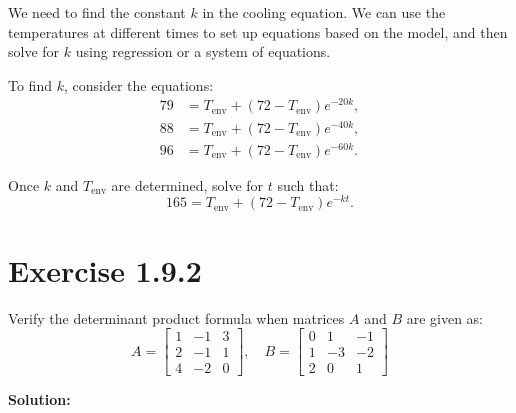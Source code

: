 \documentclass[12pt]{article}
\begin{document}

We need to find the constant \( k \) in the cooling equation. We can use the temperatures at different times to set up equations based on the model, and then solve for \( k \) using regression or a system of equations.


To find \( k \), consider the equations:
\[
  \begin{aligned}
    79 & = T_{\text{env}} + (72 - T_{\text{env}}) e^{-20k}, \\
    88 & = T_{\text{env}} + (72 - T_{\text{env}}) e^{-40k}, \\
    96 & = T_{\text{env}} + (72 - T_{\text{env}}) e^{-60k}.
  \end{aligned}
\]

Once \( k \) and \( T_{\text{env}} \) are determined, solve for \( t \) such that:
\[
  165 = T_{\text{env}} + (72 - T_{\text{env}}) e^{-kt}.
\]

\pagebreak

\section*{Exercise 1.9.2}
Verify the determinant product formula when matrices \(A\) and \(B\) are given as:
\[
  A = \begin{bmatrix} 1 & -1 & 3 \\ 2 & -1 & 1 \\ 4 & -2 & 0 \end{bmatrix}, \quad B = \begin{bmatrix} 0 & 1 & -1 \\ 1 & -3 & -2 \\ 2 & 0 & 1 \end{bmatrix}
\]

\textbf{Solution:}
\end{document}
